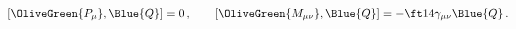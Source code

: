 \begin{equation}
 \left[  \OliveGreen{P_\mu },\Blue{Q}\right] =0\,,\qquad
 \left[\OliveGreen{M_{\mu \nu }},\Blue{Q}\right] =-\ft14\gamma _{\mu \nu
 }\Blue{Q}\,.
 \label{QPQM}
\end{equation}

